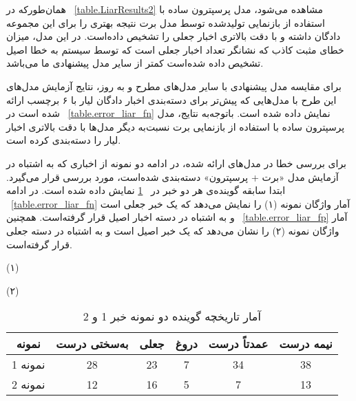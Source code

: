 همان‌طورکه در \tablename~\ref{table.LiarResults2}  مشاهده می‌شود، مدل پرسپترون ساده با استفاده از بازنمایی تولیدشده توسط مدل برت نتیجه بهتری را برای این مجموعه دادگان داشته‌ و با دقت بالاتری اخبار جعلی را تشخیص داده‌است.  در این مدل، میزان خطای مثبت کاذب که نشانگر تعداد اخبار جعلی است که توسط سیستم به خطا اصیل تشخیص داده شده‌است کمتر از سایر مدل پیشنهادی ما می‌باشد.

برای مقایسه مدل پیشنهادی با سایر مدل‌های مطرح و به‌ روز، نتایج آزمایش مدل‌های این طرح با مدل‌هایی که پیش‌تر برای دسته‌بندی اخبار دادگان لیار با ۶ برچسب ارائه شده‌ است در\tablename~ \ref{table.error_liar_fn} نمایش داده شده‌ است.  باتوجه‌به نتایج، مدل پرسپترون ساده با استفاده از بازنمایی برت نسبت‌به دیگر مدل‌ها با دقت بالاتری اخبار لیار را دسته‌بندی کرده ‌است.

برای بررسی خطا در مدل‌های ارائه شده، در ادامه دو نمونه از اخباری که به اشتباه در آزمایش مدل «برت + پرسپترون» دسته‌بندی شده‌است، مورد بررسی قرار می‌گیرد. ابتدا سابقه گوینده‌ی هر دو خبر در  \tablename~\ref{table.error_history_liar_fn}  نمایش داده شده‌ است.  در ادامه  \tablename~\ref{table.error_liar_fn}   آمار واژگان نمونه  (۱)   را نمایش می‌دهد که یک خبر جعلی است و به اشتباه در دسته اخبار اصیل قرار گرفته‌است. همچنین  \tablename~\ref{table.error_liar_fp}   آمار واژگان نمونه  (۲)   را نشان می‌دهد که یک خبر اصیل است و به اشتباه در دسته جعلی قرار گرفته‌است. 



(۱)\\
\begin{flushleft}\end{flushleft}

(۲)\\
\begin{flushleft}\end{flushleft}

\begin{table}[!h]
	\caption{آمار تاریخچه گوینده دو نمونه خبر  1  و  2 }
	\label{table.error_history_liar_fn}
	\begin{center}
		\begin{tabular}{|c|c|c|c|c|c|}
			\hline
			نمونه & به‌سختی درست & جعلی & دروغ & عمدتاً درست & نیمه درست \\
			\hline
			\hline
			نمونه  1  & 28 & 23 & 7 & 34 & 38 \\ \hline
			نمونه  2  & 12 & 16 & 5 & 7 & 13 \\ \hline
		\end{tabular}
	\end{center}
\end{table}



